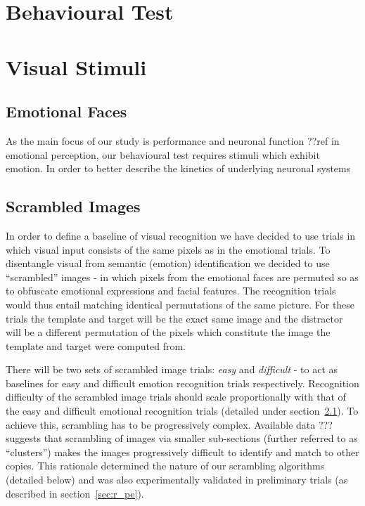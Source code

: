     \section{Behavioural Test}
	
    \section{Visual Stimuli}
	\subsection{Emotional Faces}\label{sec:m_vs_ef}
	As the main focus of our study is performance and neuronal function ??ref in emotional perception, our behavioural test requires stimuli which exhibit emotion.
	In order to better describe the kinetics of underlying neuronal systems 
	\subsection{Scrambled Images}\label{sec:m_vs_si}
	In order to define a baseline of visual recognition we have decided to use trials in which visual input consists of the same pixels as in the emotional trials. 
	To disentangle visual from semantic (emotion) identification we decided to use “scrambled” images - in which pixels from the emotional faces are permuted so as to obfuscate emotional expressions and facial features.
	The recognition trials would thus entail matching identical permutations of the same picture.
	For these trials the template and target will be the exact same image and the distractor will be a different permutation of the pixels which constitute the image the template and target were computed from. 
	
	There will be two sets of scrambled image trials: \textit{easy} and \textit{difficult} - to act as baselines for easy and difficult emotion recognition trials respectively.
	Recognition difficulty of the scrambled image trials should scale proportionally with that of the easy and difficult emotional recognition trials (detailed under section~\ref{sec:m_vs_ef}).
	To achieve this, scrambling has to be progressively complex.
	Available data ??? suggests that scrambling of images via smaller sub-sections (further referred to as “clusters”) makes the images progressively difficult to identify and match to other copies.
	This rationale determined the nature of our scrambling algorithms (detailed below) and was also experimentally validated in preliminary trials (as described in section~\ref{sec:r_pe}).
	
